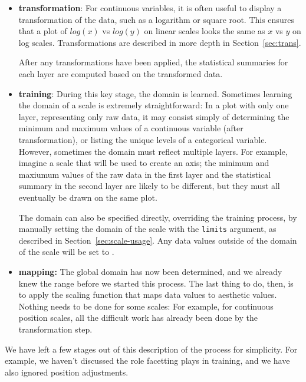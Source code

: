 \begin{itemize}

  \item {\bf transformation}: For continuous variables, it is often useful to display a transformation of the data, such as a logarithm or square root.  This ensures that a plot of $log(x)$ vs $log(y)$ on linear scales looks the same as $x$ vs $y$ on log scales.  Transformations are described in more depth in Section~\ref{sec:trans}.

  After any transformations have been applied, the statistical summaries for each layer are computed based on the transformed data.

  \item {\bf training}:  During this key stage, the domain is learned.  Sometimes learning the domain of a scale is extremely straightforward: In a plot with only one layer, representing only raw data, it may consist simply of determining the minimum and maximum values of a continuous variable (after transformation), or listing the unique levels of a categorical variable.  However, sometimes the domain must reflect multiple layers.  For example, imagine a scale that will be used to create an axis; the minimum and maxiumum values of the raw data in the first layer and the statistical summary in the second layer are likely to be different, but they must all eventually be drawn on the same plot.

  The domain can also be specified directly, overriding the training process, by manually setting the domain of the scale with the {\tt limits} argument, as described in Section~\ref{sec:scale-usage}.  Any data values outside of the domain of the scale will be set to .

  \item {\bf mapping:}  The global domain has now been determined, and we already knew the range before we started this process.  The last thing to do, then, is to apply the scaling function that maps data values to aesthetic values.  Nothing needs to be done for some scales: For example, for continuous position scales, all the difficult work has already been done by the transformation step.

\end{itemize}

We have left a few stages out of this description of the process for simplicity.  For example, we haven't discussed the role facetting plays in training, and we have also ignored position adjustments.

